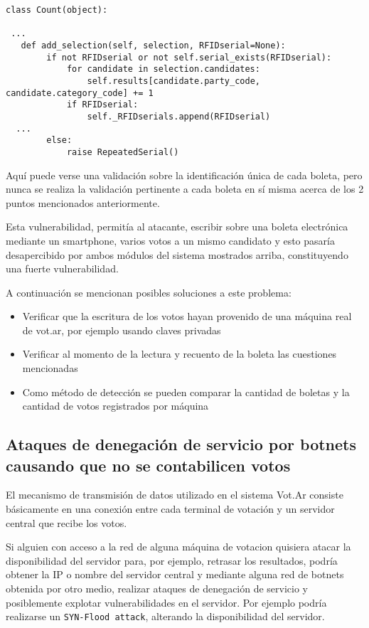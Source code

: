 \begin{lstlisting}
class Count(object):

 ...
   def add_selection(self, selection, RFIDserial=None):
        if not RFIDserial or not self.serial_exists(RFIDserial):
            for candidate in selection.candidates:
                self.results[candidate.party_code, candidate.category_code] += 1
            if RFIDserial:
                self._RFIDserials.append(RFIDserial)
  ...
        else:
            raise RepeatedSerial()
\end{lstlisting}

Aquí puede verse una validación sobre la identificación única de cada boleta, pero nunca se realiza la validación pertinente a cada boleta en sí misma acerca de los 2 puntos mencionados anteriormente.

Esta vulnerabilidad, permitía al atacante, escribir sobre una boleta electrónica mediante un smartphone, varios votos a un mismo candidato y esto pasaría desapercibido por ambos módulos del sistema mostrados arriba, constituyendo una fuerte vulnerabilidad.

A continuación se mencionan posibles soluciones a este problema:

\begin{itemize}
	\item Verificar que la escritura de los votos hayan provenido de una máquina real de vot.ar, por ejemplo usando claves privadas
	\item Verificar al momento de la lectura y recuento de la boleta las cuestiones mencionadas
	\item Como método de detección se pueden comparar la cantidad de boletas y la cantidad de votos registrados por máquina
\end{itemize}


\subsection{Ataques de denegación de servicio por botnets causando que no se contabilicen votos}

El mecanismo de transmisión de datos utilizado en el sistema Vot.Ar consiste básicamente en una conexión entre cada terminal de votación y un servidor central que recibe los votos.

Si alguien con acceso a la red de alguna máquina de votacion quisiera atacar la disponibilidad del servidor para, por ejemplo, retrasar los resultados, podría obtener la IP o nombre del servidor central y mediante alguna red de botnets obtenida por otro medio, realizar ataques de denegación de servicio y posiblemente explotar vulnerabilidades en el servidor. Por ejemplo podría realizarse un \texttt{SYN-Flood attack}, alterando la disponibilidad del servidor.



